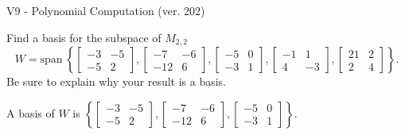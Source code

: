 \begin{exercise}
  \begin{exerciseTitle}V9 - Polynomial Computation (ver. 202)\end{exerciseTitle}
  \begin{exerciseStatement}
    Find a basis for the subspace of \(M_{2,2}\) 
\[W=\mathrm{span}\ \left\{\left[\begin{array}{cc}
-3 & -5 \\
-5 & 2
\end{array}\right] , \left[\begin{array}{cc}
-7 & -6 \\
-12 & 6
\end{array}\right] , \left[\begin{array}{cc}
-5 & 0 \\
-3 & 1
\end{array}\right] , \left[\begin{array}{cc}
-1 & 1 \\
4 & -3
\end{array}\right] , \left[\begin{array}{cc}
21 & 2 \\
2 & 4
\end{array}\right]\right\}.\]
 Be sure to explain why your result is a basis.


  \end{exerciseStatement}
  \begin{exerciseAnswer}
   A basis of \(W\) is  \(\left\{\left[\begin{array}{cc}
-3 & -5 \\
-5 & 2
\end{array}\right] , \left[\begin{array}{cc}
-7 & -6 \\
-12 & 6
\end{array}\right] , \left[\begin{array}{cc}
-5 & 0 \\
-3 & 1
\end{array}\right]\right\}\).
  


  \end{exerciseAnswer}
\end{exercise}